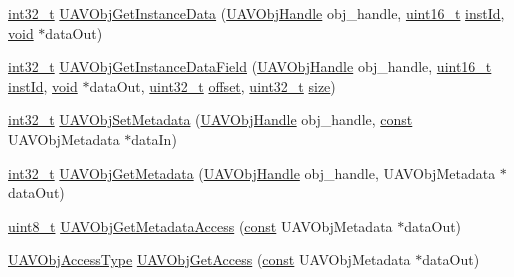 \begin{DoxyCompactItemize}
\item 
\hyperlink{group___n_a_m_e_gafd12020da5a235dfcf0c3c748fb5baed}{int32\-\_\-t} \hyperlink{group___u_a_v_ga955799ae236e66aef4070f79d530d73c}{U\-A\-V\-Obj\-Get\-Instance\-Data} (\hyperlink{group___n_a_m_e_gac31715ab50a1903838e7d87c8022ec75}{U\-A\-V\-Obj\-Handle} obj\-\_\-handle, \hyperlink{stdint_8h_a273cf69d639a59973b6019625df33e30}{uint16\-\_\-t} \hyperlink{group___n_a_m_e_ga874457c6d2526c90ec75fa5a37d687ca}{inst\-Id}, \hyperlink{group___n_a_m_e_ga18028b8badbf1ea7e704ccac3c488e82}{void} $\ast$data\-Out)
\item 
\hyperlink{group___n_a_m_e_gafd12020da5a235dfcf0c3c748fb5baed}{int32\-\_\-t} \hyperlink{group___u_a_v_gadc17f6e4b8121257308645c34c5e48c8}{U\-A\-V\-Obj\-Get\-Instance\-Data\-Field} (\hyperlink{group___n_a_m_e_gac31715ab50a1903838e7d87c8022ec75}{U\-A\-V\-Obj\-Handle} obj\-\_\-handle, \hyperlink{stdint_8h_a273cf69d639a59973b6019625df33e30}{uint16\-\_\-t} \hyperlink{group___n_a_m_e_ga874457c6d2526c90ec75fa5a37d687ca}{inst\-Id}, \hyperlink{group___n_a_m_e_ga18028b8badbf1ea7e704ccac3c488e82}{void} $\ast$data\-Out, \hyperlink{stdint_8h_a435d1572bf3f880d55459d9805097f62}{uint32\-\_\-t} \hyperlink{group___copter_control_b_l_gaa9fff43968831437a312428836cab362}{offset}, \hyperlink{stdint_8h_a435d1572bf3f880d55459d9805097f62}{uint32\-\_\-t} \hyperlink{pios__opahrs__proto_8h_ae5dc6ffcd9b7605c7787791e40cc6bb0}{size})
\item 
\hyperlink{group___n_a_m_e_gafd12020da5a235dfcf0c3c748fb5baed}{int32\-\_\-t} \hyperlink{group___u_a_v_ga0e590d06148882b63affa37888f043df}{U\-A\-V\-Obj\-Set\-Metadata} (\hyperlink{group___n_a_m_e_gac31715ab50a1903838e7d87c8022ec75}{U\-A\-V\-Obj\-Handle} obj\-\_\-handle, \hyperlink{group___n_a_m_e_ga7ae6d0e43244213b34de2c2b9aa30da6}{const} U\-A\-V\-Obj\-Metadata $\ast$data\-In)
\item 
\hyperlink{group___n_a_m_e_gafd12020da5a235dfcf0c3c748fb5baed}{int32\-\_\-t} \hyperlink{group___u_a_v_gac4ddbaf9ae7938badae8552d4ef88b20}{U\-A\-V\-Obj\-Get\-Metadata} (\hyperlink{group___n_a_m_e_gac31715ab50a1903838e7d87c8022ec75}{U\-A\-V\-Obj\-Handle} obj\-\_\-handle, U\-A\-V\-Obj\-Metadata $\ast$data\-Out)
\item 
\hyperlink{stdint_8h_aba7bc1797add20fe3efdf37ced1182c5}{uint8\-\_\-t} \hyperlink{group___u_a_v_ga5450b62ee4714514ae0a42bb1adeb904}{U\-A\-V\-Obj\-Get\-Metadata\-Access} (\hyperlink{group___n_a_m_e_ga7ae6d0e43244213b34de2c2b9aa30da6}{const} U\-A\-V\-Obj\-Metadata $\ast$data\-Out)
\item 
\hyperlink{group___u_a_v_ga04b37fd239d7727a21668d35d11ad7df}{U\-A\-V\-Obj\-Access\-Type} \hyperlink{group___u_a_v_ga12c0d67f8bad145c45ad68a93abbb035}{U\-A\-V\-Obj\-Get\-Access} (\hyperlink{group___n_a_m_e_ga7ae6d0e43244213b34de2c2b9aa30da6}{const} U\-A\-V\-Obj\-Metadata $\ast$data\-Out)

\end{DoxyCompactItemize}
